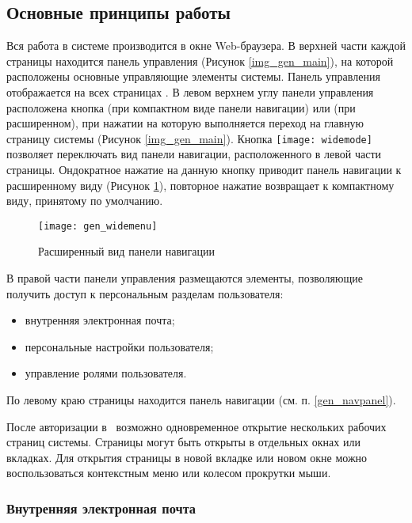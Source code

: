 \subsection{Основные принципы работы}

Вся работа в системе производится в окне Web-браузера. В верхней части каждой страницы находится панель управления (Рисунок \ref{img_gen_main}), на которой расположены основные управляющие элементы системы. Панель управления отображается на всех страницах \tmisr.  В левом верхнем углу панели управления расположена кнопка  (при компактном виде панели навигации) или  (при расширенном), при нажатии на которую выполняется переход на главную страницу системы (Рисунок \ref{img_gen_main}). Кнопка \texttt{[image: widemode]} позволяет переключать вид панели навигации, расположенного в левой части страницы. Ондократное нажатие на данную кнопку приводит панель навигации к расширенному виду (Рисунок \ref{img_gen_widemenu}), повторное нажатие возвращает к компактному виду, принятому по умолчанию.

 \begin{figure}[!ht]\centering
 	\texttt{[image: gen\_widemenu]}
 	\caption{Расширенный вид панели навигации}
 	\label{img_gen_widemenu}
 \end{figure}
 
В правой части панели управления размещаются элементы, позволяющие получить доступ к персональным разделам пользователя: 
\begin{itemize}
 \item внутренняя электронная почта;
 \item персональные настройки пользователя;
 \item управление ролями пользователя.
\end{itemize}

По левому краю страницы находится панель навигации (см. п. \ref{gen_navpanel}). 

\begin{prim}
 После авторизации в \tmisp~возможно одновременное открытие нескольких рабочих страниц системы. Страницы могут быть открыты в отдельных окнах или вкладках. Для открытия страницы в новой вкладке или новом окне можно воспользоваться контекстным меню или колесом прокрутки мыши.
\end{prim}


\subsubsection{Внутренняя электронная почта}

